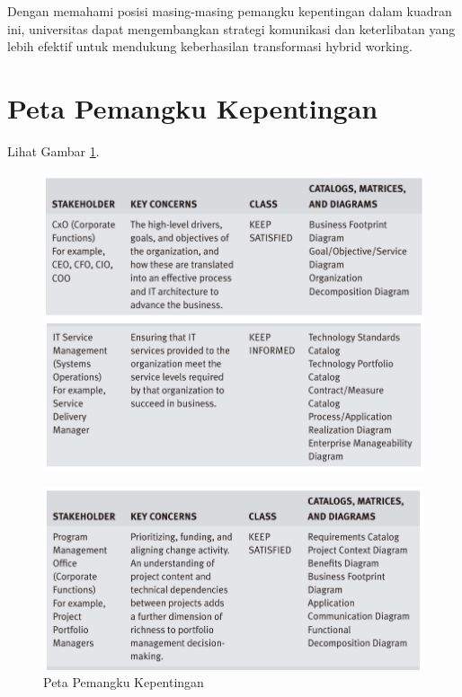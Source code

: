 Dengan memahami posisi masing-masing pemangku kepentingan dalam kuadran ini, universitas dapat mengembangkan strategi komunikasi dan keterlibatan yang lebih efektif untuk mendukung keberhasilan transformasi hybrid working.


\section{Peta Pemangku Kepentingan}
Lihat Gambar \ref{fig:stakeholders_map}.
\begin{figure}[h!]
	\centering
	\begin{minipage}[bt]{0.496\textwidth}
		\centering
		\includegraphics[width=\textwidth]{../figures/stakeholder_map_1}
		\includegraphics[width=\textwidth]{../figures/stakeholder_map_3}
	\end{minipage}
	\hfill
	\begin{minipage}[bt]{0.496\textwidth}
		\centering
		\includegraphics[width=\textwidth]{../figures/stakeholder_map_2}
	\end{minipage}
	\caption{Peta Pemangku Kepentingan}
	\label{fig:stakeholders_map}
\end{figure}


